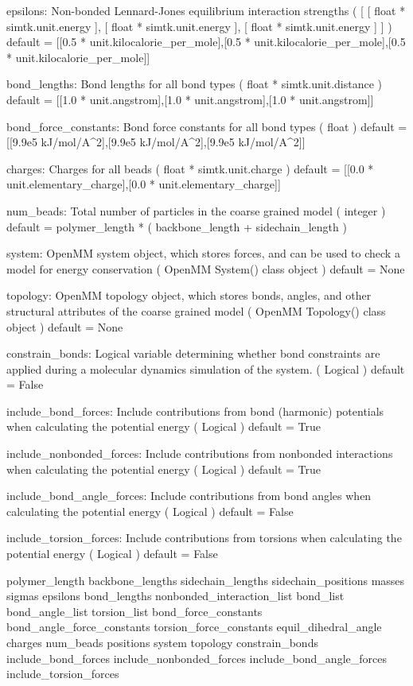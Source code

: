 \documentclass[letterpaper,12pt,english,openany,oneside]{sphinxmanual}
\begin{document}
\begin{fulllineitems}
epsilons: Non-bonded Lennard-Jones equilibrium interaction strengths
( {[} {[} float * simtk.unit.energy {]}, {[} float * simtk.unit.energy {]}, {[} float * simtk.unit.energy {]} {]} )
default = {[}{[}0.5 * unit.kilocalorie\_per\_mole{]},{[}0.5 * unit.kilocalorie\_per\_mole{]},{[}0.5 * unit.kilocalorie\_per\_mole{]}{]}

bond\_lengths: Bond lengths for all bond types
( float * simtk.unit.distance )
default = {[}{[}1.0 * unit.angstrom{]},{[}1.0 * unit.angstrom{]},{[}1.0 * unit.angstrom{]}{]}

bond\_force\_constants: Bond force constants for all bond types
( float )
default = {[}{[}9.9e5 kJ/mol/A\textasciicircum{}2{]},{[}9.9e5 kJ/mol/A\textasciicircum{}2{]},{[}9.9e5 kJ/mol/A\textasciicircum{}2{]}{]}

charges: Charges for all beads
( float * simtk.unit.charge )
default = {[}{[}0.0 * unit.elementary\_charge{]},{[}0.0 * unit.elementary\_charge{]}{]}

num\_beads: Total number of particles in the coarse grained model
( integer )
default = polymer\_length * ( backbone\_length + sidechain\_length )

system: OpenMM system object, which stores forces, and can be used
to check a model for energy conservation
( OpenMM System() class object )
default = None

topology: OpenMM topology object, which stores bonds, angles, and
other structural attributes of the coarse grained model
( OpenMM Topology() class object )
default = None

constrain\_bonds: Logical variable determining whether bond constraints
are applied during a molecular dynamics simulation of the system.
( Logical )
default = False

include\_bond\_forces: Include contributions from bond
(harmonic) potentials when calculating the potential energy
( Logical )
default = True

include\_nonbonded\_forces: Include contributions from nonbonded
interactions when calculating the potential energy
( Logical )
default = True

include\_bond\_angle\_forces: Include contributions from bond angles
when calculating the potential energy
( Logical )
default = False

include\_torsion\_forces: Include contributions from torsions
when calculating the potential energy
( Logical )
default = False

polymer\_length
backbone\_lengths
sidechain\_lengths
sidechain\_positions
masses
sigmas
epsilons
bond\_lengths
nonbonded\_interaction\_list
bond\_list
bond\_angle\_list
torsion\_list
bond\_force\_constants
bond\_angle\_force\_constants
torsion\_force\_constants
equil\_dihedral\_angle
charges
num\_beads
positions
system
topology
constrain\_bonds
include\_bond\_forces
include\_nonbonded\_forces
include\_bond\_angle\_forces
include\_torsion\_forces


\end{fulllineitems}
\end{document}
